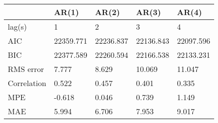 \begin{tabular}{lllll}
\toprule
{} &      AR(1) &      AR(2) &      AR(3) &      AR(4) \\
\midrule
lag(s)      &          1 &          2 &          3 &          4 \\
AIC         &  22359.771 &  22236.837 &  22136.843 &  22097.596 \\
BIC         &  22377.589 &  22260.594 &  22166.538 &  22133.231 \\
RMS error   &      7.777 &      8.629 &     10.069 &     11.047 \\
Correlation &      0.522 &      0.457 &      0.401 &      0.335 \\
MPE         &     -0.618 &      0.046 &      0.739 &      1.149 \\
MAE         &      5.994 &      6.706 &      7.953 &      9.017 \\
\bottomrule
\end{tabular}
